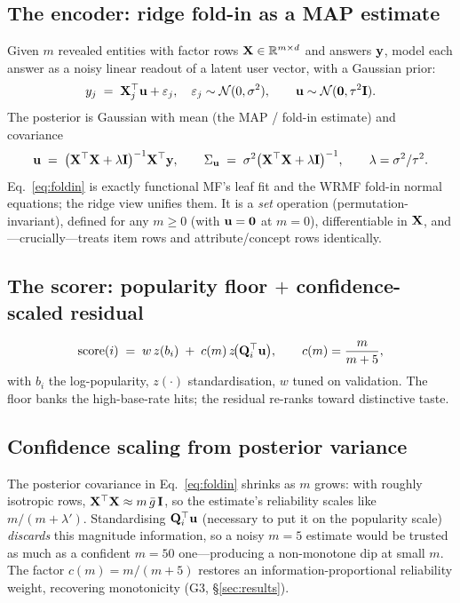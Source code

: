 \subsection{The encoder: ridge fold-in as a MAP estimate}\label{sec:foldin}
Given $m$ revealed entities with factor rows $\mathbf{X}\in\mathbb{R}^{m\times d}$ and answers $\mathbf{y}$, model each answer as a noisy
linear readout of a latent user vector, with a Gaussian prior:
\begin{equation}
  y_j \;=\; \mathbf{X}_j^\top \mathbf{u} + \varepsilon_j,\quad \varepsilon_j\sim\mathcal N(0,\sigma^2),\qquad
  \mathbf{u}\sim\mathcal N(\mathbf 0,\tau^2\mathbf{I}).
\end{equation}
The posterior is Gaussian with mean (the MAP / fold-in estimate) and covariance
\begin{equation}\label{eq:foldin}
  \mathbf{u} \;=\; \bigl(\mathbf{X}^\top\mathbf{X} + \lambda\mathbf{I}\bigr)^{-1}\mathbf{X}^\top\mathbf{y},\qquad
  \Sigma_{\mathbf{u}} \;=\; \sigma^2\bigl(\mathbf{X}^\top\mathbf{X}+\lambda\mathbf{I}\bigr)^{-1},\qquad \lambda=\sigma^2/\tau^2.
\end{equation}
Eq.~\eqref{eq:foldin} is exactly functional MF's leaf fit and the WRMF fold-in normal equations; the ridge view
unifies them. It is a \emph{set} operation (permutation-invariant), defined for any $m\ge 0$ (with $\mathbf{u}=\mathbf 0$
at $m{=}0$), differentiable in $\mathbf{X}$, and---crucially---treats item rows and attribute/concept rows identically.

\subsection{The scorer: popularity floor $+$ confidence-scaled residual}
\begin{equation}\label{eq:score}
  \mathrm{score}(i) \;=\; w\,z(b_i) \;+\; c(m)\,z\!\bigl(\mathbf{Q}_i^\top\mathbf{u}\bigr),\qquad c(m)=\frac{m}{m+5},
\end{equation}
with $b_i$ the log-popularity, $z(\cdot)$ standardisation, $w$ tuned on validation. The floor banks the
high-base-rate hits; the residual re-ranks toward distinctive taste.

\subsection{Confidence scaling from posterior variance}\label{sec:conf}
The posterior covariance in Eq.~\eqref{eq:foldin} shrinks as $m$ grows: with roughly isotropic rows,
$\mathbf{X}^\top\mathbf{X}\approx m\,\bar g\,\mathbf{I}$, so the estimate's reliability scales like $m/(m+\lambda')$. Standardising
$\mathbf{Q}_i^\top\mathbf{u}$ (necessary to put it on the popularity scale) \emph{discards} this magnitude information, so a noisy
$m{=}5$ estimate would be trusted as much as a confident $m{=}50$ one---producing a non-monotone dip at small $m$.
The factor $c(m)=m/(m+5)$ restores an information-proportional reliability weight, recovering monotonicity (G3,
\S\ref{sec:results}).

